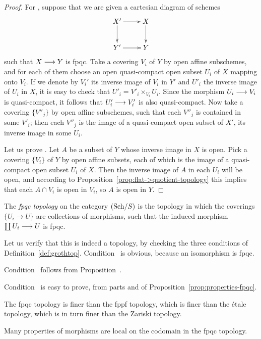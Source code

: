\begin{2   CONTRAVARIANT FUNCTORS}
\begin{2.3 Sheaves in Grothendieck topologies}
\begin{proof}
For , suppose that we are given a cartesian diagram of schemes
   \[
   \xymatrix{
   X' \ar[r]\ar[d] & X \ar[d] \\
   Y' \ar[r] & Y
   }
   \]
such that $X \arr Y$ is fpqc. Take a covering $V_i$ of $Y$ by open affine subschemes, and for each of them choose an open quasi-compact open subset $U_i$ of $X$ mapping onto $V_i$. If we denote by $V_i'$ its inverse image of $V_i$ in $Y'$ and $U'_i$ the inverse image of $U_i$ in $X$, it is easy to check that $U'_i = V'_i \times_{V_i} U_i$. Since the morphism $U_i \arr V_i$ is quasi-compact, it follows that $U'_i \arr V'_i$ is also quasi-compact. Now take a covering $\{V''_j\}$ by open affine subschemes, such that each $V''_j$ is contained in some $V'_i$; then each $V''_j$ is the image of a quasi-compact open subset of $X'$, its inverse image in some $U_i$.

Let us prove . Let $A$ be a subset of $Y$ whose inverse image in $X$ is open. Pick a covering $\{V_i\}$ of $Y$ by open affine subsets, each of which is the image of a quasi-compact open subset $U_i$ of $X$. Then the inverse image of $A$ in each $U_i$ will be open, and according to Proposition~\ref{prop:flat->quotient-topology} this implies that each $A \cap V_i$ is open in $V_i$, so $A$ is open in $Y$.
\end{proof}




The \emph{fpqc topology} on the category $({\mathrm{Sch}/S})$ is the topology in which the coverings $\{U_i \to U\}$ are collections of morphisms, such that the induced morphism $\coprod U_i \arr U$ is fpqc.

Let us verify that this is indeed a topology, by checking the three conditions of Definition~\ref{def:grothtop}. Condition~ is obvious, because an isomorphism is fpqc.

Condition~ follows from Proposition~.

Condition~ is easy to prove, from parts
 and  of Proposition~\ref{prop:properties-fpqc}.

The fpqc topology is finer than the fppf topology, which is finer than the \'etale topology, which is in turn finer than the Zariski topology.

Many properties of morphisms are local on the codomain in the fpqc topology.


\end{2.3 Sheaves in Grothendieck topologies}
\end{2   CONTRAVARIANT FUNCTORS}

